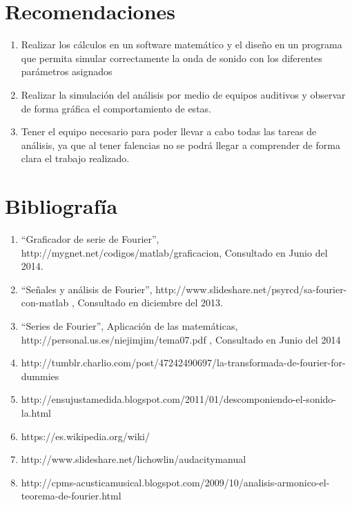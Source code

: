 \documentclass[10pt,a4paper]{book}
\begin{document}
\section{Recomendaciones}

\begin{enumerate}
\item Realizar los cálculos en un software matemático y el diseño en un programa que permita simular correctamente la onda de sonido con los diferentes parámetros asignados
\item Realizar la simulación del análisis por medio de equipos auditivos y observar de forma gráfica el comportamiento de estas.
\item Tener el equipo necesario para poder llevar a cabo todas las tareas de análisis, ya que al tener falencias no se podrá llegar a comprender de forma clara el trabajo realizado.

\end{enumerate}

\section{Bibliografía}

\begin{enumerate}
\item “Graficador de serie de Fourier”, http://mygnet.net/codigos/matlab/graficacion, Consultado en Junio del 2014.
\item “Señales y análisis de Fourier”, http://www.slideshare.net/psyrcd/sa-fourier-con-matlab , Consultado en diciembre del 2013.
\item “Series de Fourier”, Aplicación de las matemáticas, http://personal.us.es/niejimjim/tema07.pdf , Consultado en Junio del 2014
\item http://tumblr.charlio.com/post/47242490697/la-transformada-de-fourier-for-dummies
\item http://ensujustamedida.blogspot.com/2011/01/descomponiendo-el-sonido-la.html
\item https://es.wikipedia.org/wiki/
\item http://www.slideshare.net/lichowlin/audacitymanual
\item http://cpms-acusticamusical.blogspot.com/2009/10/analisis-armonico-el-teorema-de-fourier.html
\end{enumerate}
\end{document}
